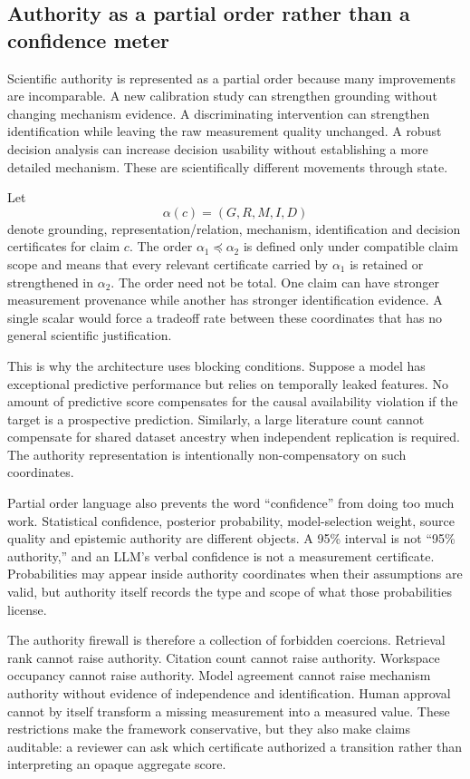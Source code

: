 \subsection{Authority as a partial order rather than a confidence meter}

Scientific authority is represented as a partial order because many improvements are incomparable. A new calibration study can strengthen grounding without changing mechanism evidence. A discriminating intervention can strengthen identification while leaving the raw measurement quality unchanged. A robust decision analysis can increase decision usability without establishing a more detailed mechanism. These are scientifically different movements through state.

Let
\[
\alpha(c)=(G,R,M,I,D)
\]
denote grounding, representation/relation, mechanism, identification and decision certificates for claim \(c\). The order \(\alpha_1\preceq\alpha_2\) is defined only under compatible claim scope and means that every relevant certificate carried by \(\alpha_1\) is retained or strengthened in \(\alpha_2\). The order need not be total. One claim can have stronger measurement provenance while another has stronger identification evidence. A single scalar would force a tradeoff rate between these coordinates that has no general scientific justification.

This is why the architecture uses blocking conditions. Suppose a model has exceptional predictive performance but relies on temporally leaked features. No amount of predictive score compensates for the causal availability violation if the target is a prospective prediction. Similarly, a large literature count cannot compensate for shared dataset ancestry when independent replication is required. The authority representation is intentionally non-compensatory on such coordinates.

Partial order language also prevents the word ``confidence'' from doing too much work. Statistical confidence, posterior probability, model-selection weight, source quality and epistemic authority are different objects. A 95\% interval is not ``95\% authority,'' and an LLM's verbal confidence is not a measurement certificate. Probabilities may appear inside authority coordinates when their assumptions are valid, but authority itself records the type and scope of what those probabilities license.

The authority firewall is therefore a collection of forbidden coercions. Retrieval rank cannot raise authority. Citation count cannot raise authority. Workspace occupancy cannot raise authority. Model agreement cannot raise mechanism authority without evidence of independence and identification. Human approval cannot by itself transform a missing measurement into a measured value. These restrictions make the framework conservative, but they also make claims auditable: a reviewer can ask which certificate authorized a transition rather than interpreting an opaque aggregate score.

